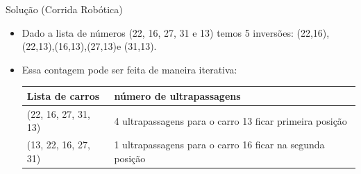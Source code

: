 \documentclass{beamer}
\begin{document}
\begin{frame}{Solução (Corrida Robótica)}

\begin{itemize}

\pause \item Dado a lista de números (22, 16, 27, 31 e 13) temos 5 inversões: \pause (22,16)\pause ,(22,13)\pause,(16,13)\pause,(27,13)\pause e (31,13).

\pause \item Essa contagem pode ser feita de maneira iterativa:

\begin{tabular}{l|p{5cm}}
Lista de carros                 & número de ultrapassagens\\
\hline
(22, 16, 27, 31, 13) & 4 ultrapassagens para o carro 13 ficar primeira posição\\
(13, 22, 16, 27, 31) & 1 ultrapassagens para o carro 16 ficar na segunda posição\\

\end{tabular}
\end{itemize}

\end{frame}
\end{document}
